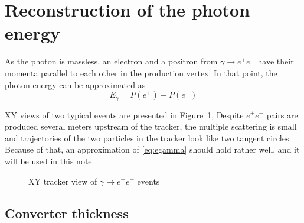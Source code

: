 \section{Reconstruction of the photon energy}

As the photon is massless, an electron and a positron from $\gamma \to e^+e^-$ have their
momenta parallel to each other in the production vertex. In that point, the photon energy
can be approximated as
\begin{equation} \label{eq:egamma}
  E_\gamma = P(e^+) + P(e^-) 
\end{equation}
               
XY views of two typical events are presented in Figure~\ref{figure:rpc07b0s51r0100_xy_view},
Despite $e^+e^-$ pairs are produced several meters upstream of the tracker,
the multiple scattering is small and trajectories of the two particles
in the tracker look like two tangent circles. Because of that, an approximation of \ref{eq:egamma}
should hold rather well, and it will be used in this note.

\begin{figure}[H]
  \caption{
    \label{figure:rpc07b0s51r0100_xy_view}
    XY tracker view of $\gamma \to e^+e^-$ events
  }
\end{figure}


\subsection{Converter thickness}

